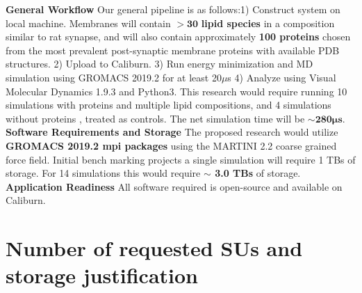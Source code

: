 \documentclass[oneside]{report}
\begin{document}
{ \bf General Workflow} Our general pipeline is as follows:1) Construct system on local machine. Membranes will contain $\pmb{>30}$ \textbf{lipid species} in a composition similar to rat synapse, and will also contain approximately \textbf{100 proteins} chosen from the most prevalent post-synaptic membrane proteins with available PDB structures. 2) Upload to Caliburn. 3) Run energy minimization and MD simulation using GROMACS 2019.2 \cite{Berendsen1995} for at least 20$\mu$s 4) Analyze using Visual Molecular Dynamics 1.9.3 \cite{HUMP96} and Python3. 
This research would require running 10 simulations with proteins and multiple lipid compositions, and 4 simulations without proteins , treated as controls. The net simulation time will be $\pmb{\sim 280 \mu s}$. \\


{\bf Software Requirements and Storage} The proposed research would utilize \textbf{GROMACS 2019.2 mpi packages } \cite{Berendsen1995} using the MARTINI 2.2\cite{Marrink2007} coarse grained force field.  Initial bench marking projects a single simulation will require 1 TBs of storage. For 14 simulations this would require \textbf{$\sim$ 3.0 TBs} of storage.\\


{\bf Application Readiness} All software required is open-source and available on Caliburn.\\ %

\section*{Number of requested SUs and storage justification}
\end{document}
